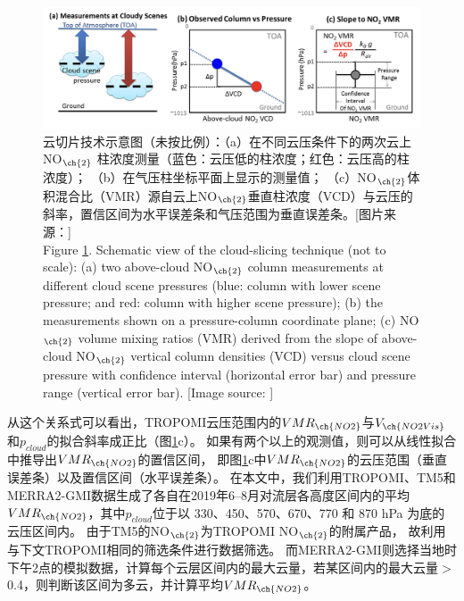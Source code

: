 \begin{figure}[H]
\centering
\includegraphics[width=\textwidth]{./figures/cloud-slicing_schematic.png}
\caption{云切片技术示意图（未按比例）：（a）在不同云压条件下的两次云上NO$_{\ch{2}}$ 柱浓度测量（蓝色：云压低的柱浓度；红色：云压高的柱浓度）；
（b）在气压柱坐标平面上显示的测量值； （c）NO$_{\ch{2}}$体积混合比（VMR）源自云上NO$_{\ch{2}}$垂直柱浓度（VCD）与云压的斜率，置信区间为水平误差条和气压范围为垂直误差条。[图片来源：\citet{Choi.2014}]\\
Figure \ref{fig:cloud-slicing_schematic}. Schematic view of the cloud-slicing technique (not to scale):
(a) two above-cloud NO$_{\ch{2}}$ column measurements at different cloud scene pressures (blue: column with lower scene pressure; and red: column with higher scene pressure);
(b) the measurements shown on a pressure-column coordinate plane;
(c) NO$_{\ch{2}}$ volume mixing ratios (VMR) derived from the slope of above-cloud NO$_{\ch{2}}$ vertical column densities (VCD) versus cloud scene pressure with confidence interval (horizontal error bar) and pressure range (vertical error bar). [Image source: \citet{Choi.2014}]
}
\label{fig:cloud-slicing_schematic}
\end{figure}

从这个关系式可以看出，TROPOMI云压范围内的$VMR_{\ch{NO2}}$与$V_{\ch{NO2Vis}}$和$p_{cloud}$的拟合斜率成正比（图\ref{fig:cloud-slicing_schematic}c）。
如果有两个以上的观测值，则可以从线性拟合中推导出$VMR_{\ch{NO2}}$的置信区间，
即图\ref{fig:cloud-slicing_schematic}c中$VMR_{\ch{NO2}}$的云压范围（垂直误差条）以及置信区间（水平误差条）。
在本文中，我们利用TROPOMI、TM5和MERRA2-GMI数据生成了各自在2019年6--8月对流层各高度区间内的平均$VMR_{\ch{NO2}}$，其中$p_{cloud}$位于以 330、450、570、670、770 和 870 hPa 为底的云压区间内。
由于TM5的NO$_{\ch{2}}$为TROPOMI NO$_{\ch{2}}$的附属产品，
故利用与下文TROPOMI相同的筛选条件进行数据筛选。
而MERRA2-GMI则选择当地时下午2点的模拟数据，计算每个云层区间内的最大云量，若某区间内的最大云量$>$ 0.4，则判断该区间为多云，并计算平均$VMR_{\ch{NO2}}$。

